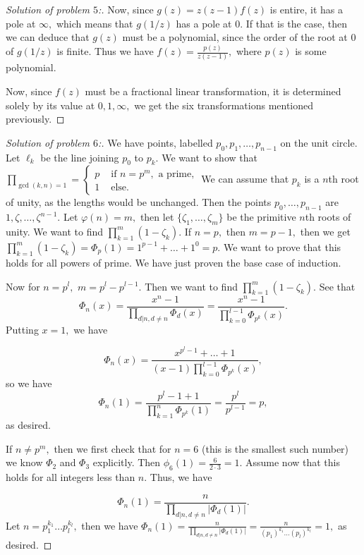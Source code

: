 \documentclass[letterpaper,11pt,twoside]{article}
\theoremstyle{proposition}
\theoremstyle{definition}
\theoremstyle{theorem}
\theoremstyle{definition}
\theoremstyle{definition}
\theoremstyle{definition}
\theoremstyle{lemma}
\theoremstyle{definition}
\theoremstyle{definition}
\theoremstyle{corollary}
\theoremstyle{definition}
\theoremstyle{definition}
\theoremstyle{definition}
\begin{document}
\begin{proof}[Solution of problem $5$:]
	Now, since $g(z)=z(z-1)f(z)$ is entire, it has a pole at $\infty,$ which means that $g(1/z)$ has a pole at $0.$ If that is the case, then we can deduce 
	that $g(z)$ must be a polynomial, since the order of the root at $0$ of $g(1/z)$ is finite. Thus we have $f(z)= \frac{p(z)}{z(z-1)},$ where $p(z)$ is 
	some polynomial. 
	
	Now, since $f(z)$ must be a fractional linear transformation, it is determined solely by its value at $0,1, \infty,$ we get the six transformations 
	mentioned previously. 	
	 
	\end{proof}
	\begin{proof}[Solution of problem $6$:]
	We have points, labelled $p_0, p_1, \dots, p_{n-1}$ on the unit circle. Let $\ell_k$ be the line joining $p_0$ to $p_k.$ We want to show that $ 
	\prod_{\gcd(k,n)=1} = \begin{cases}
		p & \text{ if } n=p^m, \text{ a prime,} \\
		1 & \text{ else.}
	\end{cases}$ 
We can assume that $p_k$ is a $n$th root of unity, as the lengths would be unchanged. Then the points $p_0, \dots, p_{n-1}$ are $1, \zeta, \dots, 
\zeta^{n-1}.$ Let $\varphi(n)=m,$ then let $ \{ \zeta_1, \dots, \zeta_m \} $ be the primitive $n$th roots of unity. We want to find $ \prod_{k=1}^{m}(1- 
\zeta_k).$ If $n=p,$ then $m=p-1,$ then we get $ \prod_{k=1}^{m}(1- \zeta_k) = \Phi_p(1) = 1^{p-1} + \dots + 1^{0} =p.$ We want to prove that this holds for 
all powers of prime. We have just proven the base case of induction. 

Now for $n=p^l,$ $m= p^l - p^{l-1}.$ Then we want to find $\prod_{k=1}^{m}(1- \zeta_k).$ See that $$\Phi_{n}(x) = \frac{ x^n -1 }{\prod_{d|n, d \neq n 
}\Phi_{d}(x)} = \frac{ x^n -1 }{\prod_{k=0}^{l-1}\Phi_{p^k}(x)}.$$ Putting $x=1,$ we have 

$$ \Phi_n(x) = \frac{x^{p^l-1}+ \dots + 1}{(x-1) \prod_{k=0}^{l-1}\Phi_{p^k}(x)},$$ so we have $$\Phi_n(1)= \frac{p^l -1 + 1}{\prod_{k=1}^{n}\Phi_{p^k}(1)}= 
\frac{p^l}{p^{l-1}}=p, $$ as desired. 

If $n \neq p^m, $ then we first check that for $n=6$ (this is the smallest such number) we know $\Phi_2$ and $\Phi_3$ explicitly. Then $\phi_6(1)= 
\frac{6}{2 \cdot 3}=1.$ Assume now that this holds for all integers less than $n.$ Thus, we have 

$$\Phi_n(1) = \frac{n}{\prod_{d|n, d \neq n}|\Phi_d(1)|}.$$ Let $n= p_1^{k_1}\dots p_l^{k_l},$ then we have $ \Phi_n(1) = \frac{n}{\prod_{d|n, d \neq 
n}|\Phi_d(1)|} = \frac{n}{(p_1)^{k_1} \dots (p_l)^{k_l}}=1,$ as desired.  

	\end{proof}
\end{document}
